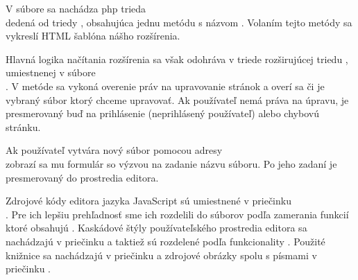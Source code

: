 V súbore  sa nachádza php trieda \\
 dedená od triedy , obsahujúca jednu metódu s názvom . Volaním tejto metódy sa vykreslí HTML šablóna nášho rozšírenia.

Hlavná logika načítania rozšírenia sa však odohráva v triede  rozširujúcej triedu , umiestnenej v súbore \\
. V metóde  sa vykoná overenie práv na upravovanie stránok a overí sa či je vybraný súbor ktorý chceme upravovať. Ak používateľ nemá práva na úpravu, je presmerovaný buď na prihlásenie (neprihlásený používateľ) alebo chybovú stránku.

Ak používateľ vytvára nový súbor pomocou adresy \\
 zobrazí sa mu formulár so výzvou na zadanie názvu súboru. Po jeho zadaní je presmerovaný do prostredia editora.

Zdrojové kódy editora jazyka JavaScript sú umiestnené v priečinku \\
. Pre ich lepšiu prehľadnosť sme ich rozdelili do súborov podľa zamerania funkcií ktoré obsahujú . Kaskádové štýly používateľského prostredia editora sa nachádzajú v priečinku  a taktiež sú rozdelené podľa funkcionality . Použité knižnice sa nachádzajú v priečinku  a zdrojové obrázky spolu s písmami v priečinku .

